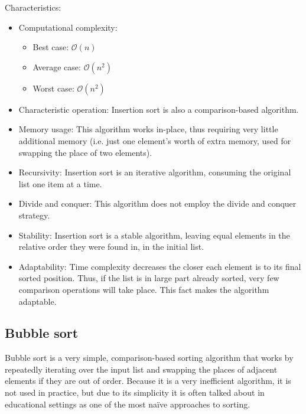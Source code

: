 \documentclass[12pt, a4paper]{article}
\begin{document}
Characteristics:
\begin{itemize}
\item Computational complexity:
\begin{itemize}
\item Best case: $\mathcal{O}(n)$
\item Average case: $\mathcal{O}(n^2)$
\item Worst case: $\mathcal{O}(n^2)$
\end{itemize}
\item Characteristic operation: Insertion sort is also a comparison-based algorithm.
\item Memory usage: This algorithm works in-place, thus requiring very little additional memory (i.e. just one element’s worth of extra memory, used for swapping the place of two elements).
\item Recursivity: Insertion sort is an iterative algorithm, consuming the original list one item at a time.
\item Divide and conquer: This algorithm does not employ the divide and conquer strategy.
\item Stability: Insertion sort is a stable algorithm, leaving equal elements in the relative order they were found in, in the initial list.
\item Adaptability: Time complexity decreases the closer each element is to its final sorted position. Thus, if the list is in large part already sorted, very few comparison operations will take place. This fact makes the algorithm adaptable.
\end{itemize}
\newpage

\subsection{Bubble sort}

Bubble sort is a very simple, comparison-based sorting algorithm that works by repeatedly iterating over the input list and swapping the places of adjacent elements if they are out of order. Because it is a very inefficient algorithm, it is not used in practice, but due to its simplicity it is often talked about in educational settings as one of the most na\"{i}ve approaches to sorting.
\end{document}
